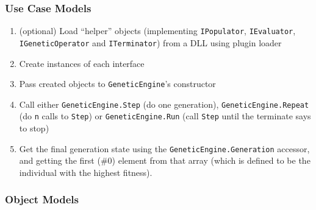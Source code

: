 \subsubsection{Use Case Models}
% 
\begin{enumerate}
 \item (optional) Load ``helper'' objects (implementing \texttt{IPopulator}, \texttt{IEvaluator}, \texttt{IGeneticOperator} and \texttt{ITerminator}) from a DLL using plugin loader
 \item Create instances of each interface
 \item Pass created objects to \texttt{GeneticEngine}'s constructor
 \item Call either \texttt{GeneticEngine.Step} (do one generation), \texttt{GeneticEngine.Repeat} (do \texttt{n} calls to \texttt{Step}) or \texttt{GeneticEngine.Run} (call \texttt{Step} until the terminate says to stop) 
 \item Get the final generation state using the \texttt{GeneticEngine.Generation} accessor, and getting the first (\#0) element from that array (which is defined to be the individual with the highest fitness).
\end{enumerate}

\subsubsection{Object Models}
